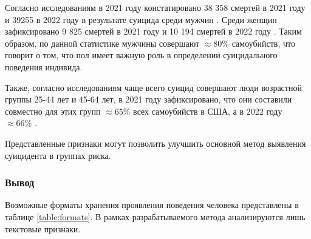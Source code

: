 Согласно исследованиям в 2021 году констатировано 38 358 смертей в 2021 году и 39255 в 2022 году в результате суицида среди мужчин \cite{suicideStats}. Среди женщин зафиксировано 9 825 смертей в 2021 году и 10 194 смертей в 2022 году \cite{suicideStats}. Таким образом, по данной статистике мужчины совершают $\approx 80\%$ самоубийств, что говорит о том, что пол имеет важную роль в определении суицидального поведения индивида.

Также, согласно исследованиям чаще всего суицид совершают люди возрастной группы 25-44 лет и 45-64 лет, в 2021 году зафиксировано, что они составили совместно для этих групп $\approx 65 \%$ всех самоубийств в США, а в 2022 году $\approx 66\%$ \cite{suicideStats}.

Представленные признаки могут позволить улучшить основной метод выявления суицидента в группах риска.



\subsubsection*{Вывод}

Возможные форматы хранения проявления поведения человека представлены в таблице \ref{table:formats}. В рамках разрабатываемого метода анализируются лишь текстовые признаки.

